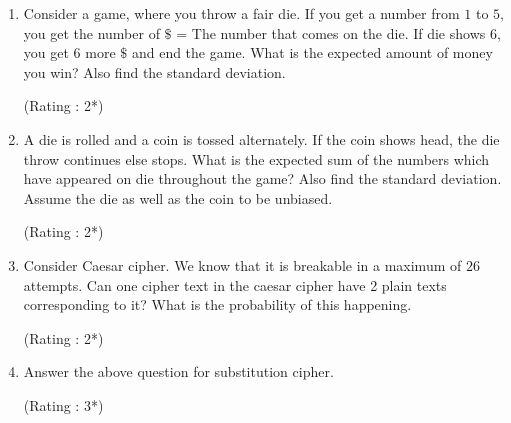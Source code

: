 \documentclass[paper=a4, fontsize=11pt]{scrartcl} %
\numberwithin{equation}{section} %
\numberwithin{figure}{section} %
\numberwithin{table}{section} %
\begin{document}
\begin{enumerate}

\item Consider a game, where you throw a fair die. If you get a number from $1$ to $5$, you get the number of $\$$ = The number that comes on the die. If die shows $6$, you get $6$ more $\$$ and end the game. What is the expected amount of money you win? Also find the standard deviation.
\begin{flushright}
\small{(Rating : 2*)}
\end{flushright}
\vspace{0.2cm}

\item A die is rolled and a coin is tossed alternately. If the coin shows head, the die throw continues else stops. What is the expected sum of the numbers which have appeared on die throughout the game? Also find the standard deviation. Assume the die as well as the coin to be unbiased. 
\begin{flushright}
\small{(Rating : 2*)}
\end{flushright}
\vspace{0.2cm}

\item Consider Caesar cipher. We know that it is breakable in a maximum of $26$ attempts. Can one cipher text in the caesar cipher have 2 plain texts corresponding to it? What is the probability of this happening.
\begin{flushright}
\small{(Rating : 2*)}
\end{flushright}
\vspace{0.2cm}

\item Answer the above question for substitution cipher.
\begin{flushright}
\small{(Rating : 3*)}
\end{flushright}
\vspace{0.2cm}
\end{enumerate}
\end{document}
